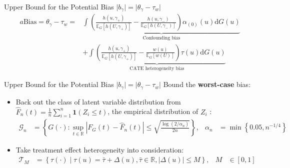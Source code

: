  \begin{frame}{Upper Bound for the Potential Bias $ \lvert b_{\gamma} \rvert = \lvert \theta_{\gamma}-\tau_{w} \rvert$}
    \begin{align*}
        a\mathrm{Bias}=\theta_{\gamma}-\tau_{w}=&\underbrace{\int\left(\frac{h\left(u,\gamma_{+}\right)}{\mathbb{E}_{G}\left[h\left(U,\gamma_{+}\right)\right]}-\frac{h\left(u,\gamma_{-}\right)}{\mathbb{E}_{G}\left[h\left(U,\gamma_{-}\right)\right]}\right)\alpha_{\left(0\right)}\left(u\right)\mathrm{d}G\left(u\right)}_{\text{Confounding bias}}\\
        &+\underbrace{\int\left(\frac{h\left(u,\gamma_{+}\right)}{\mathbb{E}_{G}\left[h\left(U,\gamma_{+}\right)\right]}-\frac{w\left(u\right)}{\mathbb{E}_{G}\left[w\left(U\right)\right]}\right)\tau\left(u\right)\mathrm{d}G\left(u\right)}_{\text{CATE heterogeneity bias}}
    \end{align*}

    
 \end{frame}


 \begin{frame}{Upper Bound for the Potential Bias $ \lvert b_{\gamma} \rvert = \lvert \theta_{\gamma}-\tau_{w} \rvert$}
    Bound the \textcolor{mygreen}{\textbf{worst-case}} bias:
    \begin{itemize}
        \item<2-> Back out the class of latent variable distribution from $\hat{F}_n(t)=\frac{1}{n}\sum^n_{i=1}\mathbf{1}(Z_i\leq t)$, the empirical distribution of $Z_i$ \citep{massart1990tight}:
        \begin{align*}
            \mathcal{G}_n &= \left\{ G(\cdot): \sup_{t\in\mathbb{R}}\left|F_{G}\left(t\right)-\hat{F}_{n}\left(t\right)\right|\leq\sqrt{\frac{\log\left(2/\alpha_{n}\right)}{2n}}  \right\}, & \alpha_n&=\min\left\{0.05,n^{-1/4} \right\}
        \end{align*}
        \item<3-> Take treatment effect heterogeneity into consideration: 
        \begin{align*}
            \mathcal{T}_{M} &=\left\{ \tau\left(\cdot\right)\mid\tau\left(u\right)=\bar{\tau}+\Delta\left(u\right), \bar{\tau}\in\mathbb{R},\left|\Delta\left(u\right)\right|\leq M\right\},& M&\in[0,1]
        \end{align*}
    \end{itemize}
    
 \end{frame}

